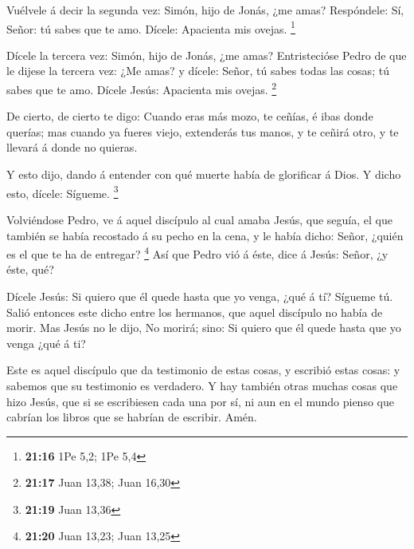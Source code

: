  Vuélvele á decir la segunda vez: Simón, hijo de Jonás,
¿me amas? Respóndele: Sí, Señor: tú sabes que te amo. Dícele: Apacienta
mis ovejas. \footnote{\textbf{21:16} 1Pe 5,2; 1Pe 5,4}

 Dícele la tercera vez: Simón, hijo de Jonás, ¿me amas?
Entristecióse Pedro de que le dijese la tercera vez: ¿Me amas? y dícele:
Señor, tú sabes todas las cosas; tú sabes que te amo. Dícele Jesús:
Apacienta mis ovejas. \footnote{\textbf{21:17} Juan 13,38; Juan 16,30}

 De cierto, de cierto te digo: Cuando eras más mozo, te
ceñías, é ibas donde querías; mas cuando ya fueres viejo, extenderás tus
manos, y te ceñirá otro, y te llevará á donde no quieras.

 Y esto dijo, dando á entender con qué muerte había de
glorificar á Dios. Y dicho esto, dícele: Sígueme. \footnote{\textbf{21:19}
  Juan 13,36}

 Volviéndose Pedro, ve á aquel discípulo al cual amaba
Jesús, que seguía, el que también se había recostado á su pecho en la
cena, y le había dicho: Señor, ¿quién es el que te ha de entregar?
\footnote{\textbf{21:20} Juan 13,23; Juan 13,25}  Así que
Pedro vió á éste, dice á Jesús: Señor, ¿y éste, qué?

 Dícele Jesús: Si quiero que él quede hasta que yo venga,
¿qué á tí? Sígueme tú.  Salió entonces este dicho entre
los hermanos, que aquel discípulo no había de morir. Mas Jesús no le
dijo, No morirá; sino: Si quiero que él quede hasta que yo venga ¿qué á
ti?

 Este es aquel discípulo que da testimonio de estas
cosas, y escribió estas cosas: y sabemos que su testimonio es verdadero.
 Y hay también otras muchas cosas que hizo Jesús, que si
se escribiesen cada una por sí, ni aun en el mundo pienso que cabrían
los libros que se habrían de escribir. Amén.
